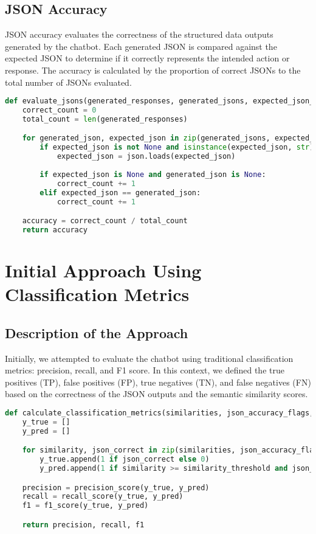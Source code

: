 \subsection{JSON Accuracy}

JSON accuracy evaluates the correctness of the structured data outputs generated by the chatbot. Each generated JSON is compared against the expected JSON to determine if it correctly represents the intended action or response. The accuracy is calculated by the proportion of correct JSONs to the total number of JSONs evaluated.

\begin{lstlisting}[language=Python, caption=Code for Classificiation of the models responded JSONs]
def evaluate_jsons(generated_responses, generated_jsons, expected_json_values):
    correct_count = 0
    total_count = len(generated_responses)

    for generated_json, expected_json in zip(generated_jsons, expected_json_values):
        if expected_json is not None and isinstance(expected_json, str):
            expected_json = json.loads(expected_json)
        
        if expected_json is None and generated_json is None:
            correct_count += 1
        elif expected_json == generated_json:
            correct_count += 1

    accuracy = correct_count / total_count
    return accuracy
\end{lstlisting}

\section{Initial Approach Using Classification Metrics}

\subsection{Description of the Approach}

Initially, we attempted to evaluate the chatbot using traditional classification metrics: precision, recall, and F1 score. In this context, we defined the true positives (TP), false positives (FP), true negatives (TN), and false negatives (FN) based on the correctness of the JSON outputs and the semantic similarity scores.

\begin{lstlisting}[language=Python, caption=Classification Metrics]
def calculate_classification_metrics(similarities, json_accuracy_flags, similarity_threshold=0.8):
    y_true = []
    y_pred = []

    for similarity, json_correct in zip(similarities, json_accuracy_flags):
        y_true.append(1 if json_correct else 0)
        y_pred.append(1 if similarity >= similarity_threshold and json_correct else 0)

    precision = precision_score(y_true, y_pred)
    recall = recall_score(y_true, y_pred)
    f1 = f1_score(y_true, y_pred)

    return precision, recall, f1
\end{lstlisting}

